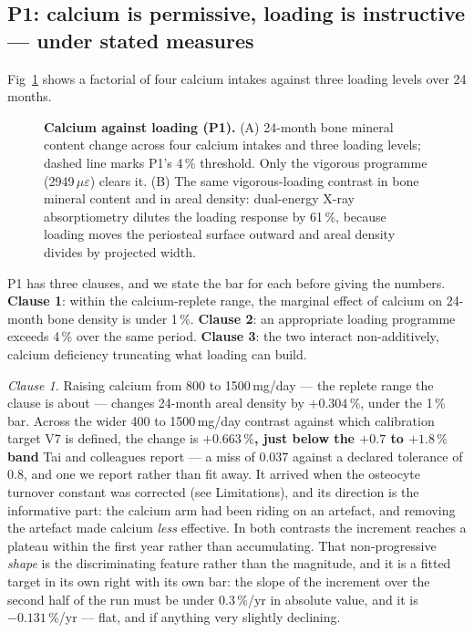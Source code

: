 \documentclass[10pt,letterpaper]{article}
\newcommand{\ue}{\ensuremath{\mu\varepsilon}}
\begin{document}
\subsection*{P1: calcium is permissive, loading is instructive --- under stated measures}

Fig~\ref{fig3} shows a factorial of four calcium intakes against three loading
levels over 24 months.

\begin{figure}[!h]
\caption{{\bf Calcium against loading (P1).}
(A) 24-month bone mineral content change across four calcium intakes and three
loading levels; dashed line marks P1's 4\,\% threshold. Only the vigorous
programme (2949\,\ue) clears it. (B) The same vigorous-loading contrast in
bone mineral content and in areal density: dual-energy X-ray absorptiometry
dilutes the loading response by 61\,\%, because loading moves the periosteal
surface outward and areal density divides by projected width.}
\label{fig3}
\end{figure}

P1 has three clauses, and we state the bar for each before giving the numbers.
\textbf{Clause 1}: within the calcium-replete range, the marginal effect of
calcium on 24-month bone density is under 1\,\%. \textbf{Clause 2}: an
appropriate loading programme exceeds 4\,\% over the same period.
\textbf{Clause 3}: the two interact non-additively, calcium deficiency
truncating what loading can build.

\emph{Clause 1.} Raising calcium from 800 to 1500\,mg/day --- the replete
range the clause is about --- changes 24-month areal density by
\textbf{$+0.304\,\%$}, under the 1\,\% bar. Across the wider 400 to
1500\,mg/day contrast against which calibration target V7 is defined, the
change is \textbf{$+0.663\,\%$, just below the $+0.7$ to $+1.8\,\%$ band}
Tai and colleagues report \cite{tai2015} --- a miss of 0.037 against a declared
tolerance of 0.8, and one we report rather than fit away. It arrived when the
osteocyte turnover constant was corrected (see Limitations), and its direction is
the informative part: the calcium arm had been riding on an artefact, and
removing the artefact made calcium \emph{less} effective. In both contrasts the increment reaches a
plateau within the first year rather than accumulating. That non-progressive
\emph{shape} is the discriminating feature rather than the magnitude, and it is
a fitted target in its own right with its own bar: the slope of the increment
over the second half of the run must be under 0.3\,\%/yr in absolute value,
and it is $-0.131\,\%$/yr --- flat, and if anything very slightly
declining.
\end{document}
